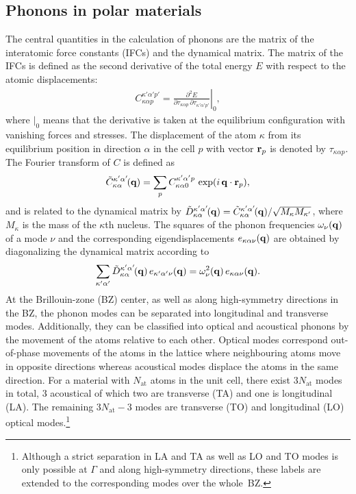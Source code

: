 \subsection{Phonons in polar materials}\label{pol_phon}
The central quantities in the calculation of phonons are the matrix of the interatomic force constants (IFCs) and the dynamical matrix. The matrix of the IFCs is defined as  the second derivative of the total energy  $E$ with respect to the atomic displacements:
%
\begin{align}
  C_{\kappa\alpha p}^{\kappa'\alpha'p'} = \left.\frac{\partial^2E}{\partial\tau_{\kappa\alpha p}\,\partial\tau_{\kappa'\alpha'p'}}\right\vert_0,
\end{align}
%
where $\vert_0$ means that the derivative is taken at the equilibrium configuration with vanishing forces and stresses. The displacement of the atom $\kappa$ from its equilibrium position in direction $\alpha$ in the cell $p$ with vector $\mathbf{r}_p$ is denoted by $\tau_{\kappa\alpha p}$. The Fourier transform of $C$ is defined as 
%
\begin{align}
    \tilde{C}_{\kappa\alpha}^{\kappa'\alpha'\!}(\mathbf{q}) =\sum_p C_{\kappa\alpha0}^{\kappa'\alpha' p}\,\exp(i\,\mathbf{q}\cdot\mathbf{r}_p),
\end{align}
%
 and is related to the dynamical matrix by $\tilde{D}_{\kappa\alpha}^{\kappa'\alpha'\!}(\mathbf{q}) = \tilde{C}_{\kappa\alpha}^{\kappa'\alpha'\!}(\mathbf{q})/\sqrt{M_\kappa M_{\kappa'}}$, where $M_\kappa$ is the mass of the $\kappa$th nucleus. The squares of the phonon frequencies $\omega_{\nu}(\mathbf{q})$ of a mode $\nu$ and the corresponding eigendisplacements $e_{\kappa\alpha\nu}(\mathbf{q})$ are obtained by diagonalizing the dynamical matrix according to
 \begin{align}
     \sum_{\kappa'\alpha'} \tilde{D}_{\kappa\alpha}^{\kappa'\alpha'\!}(\mathbf{q})\,e_{\kappa'\alpha'\nu}(\mathbf{q}) =  \omega^2_{\nu}(\mathbf{q})\,e_{\kappa\alpha\nu}(\mathbf{q}).
 \end{align}
%
At the Brillouin-zone (BZ) center, as well as along high-symmetry directions in the BZ, the phonon modes can be separated into longitudinal and transverse modes. Additionally, they can be classified into optical and acoustical phonons by the movement of the atoms relative to each other. Optical modes correspond out-of-phase movements of the atoms in the lattice  where neighbouring atoms move in opposite directions whereas acoustical modes displace the atoms in the same direction. For a material with $N_\text{at}$ atoms in the unit cell, there exist $3N_\text{at}$ modes in total, 3 acoustical of which two are transverse (TA) and one is longitudinal (LA). The remaining $3N_\text{at}-3$ modes are transverse (TO) and longitudinal (LO) optical modes.\footnote[2]{Although a strict separation in LA and TA as well as LO and TO modes is only possible at $\Gamma$ and along high-symmetry directions, these labels are extended to the corresponding modes over the whole~BZ.}\par
